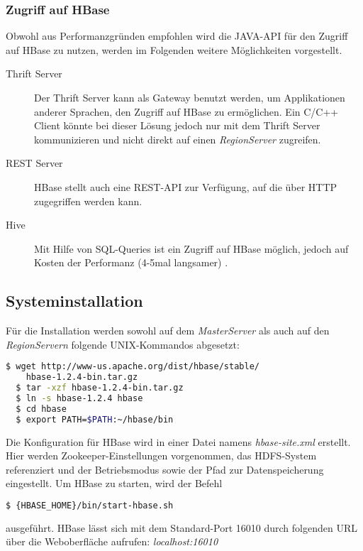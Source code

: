 \subsubsection{Zugriff auf HBase}
Obwohl aus Performanzgründen empfohlen wird die JAVA-API für den Zugriff auf HBase zu nutzen, werden im Folgenden weitere Möglichkeiten vorgestellt.
\begin{description}
\item[Thrift Server]
Der Thrift Server kann als Gateway benutzt werden, um Applikationen  anderer Sprachen, den Zugriff auf HBase zu ermöglichen. Ein C/C++ Client könnte bei dieser Lösung jedoch nur mit dem Thrift Server kommunizieren und nicht direkt auf einen \textit{RegionServer} zugreifen.

\item[REST Server]
HBase stellt auch eine REST-API zur Verfügung, auf die über HTTP zugegriffen werden kann.

\item[Hive] Mit Hilfe von SQL-Queries ist ein Zugriff auf HBase möglich, jedoch auf Kosten der Performanz (4-5mal langsamer) \cite{clo11}.
\end{description}


\subsection{Systeminstallation} %
Für die Installation werden sowohl auf dem  \textit{MasterServer} als auch auf den \textit{RegionServern} folgende UNIX-Kommandos abgesetzt:
\noindent 
\begin{lstlisting}[language=bash]
  $ wget http://www-us.apache.org/dist/hbase/stable/
    hbase-1.2.4-bin.tar.gz
  $ tar -xzf hbase-1.2.4-bin.tar.gz
  $ ln -s hbase-1.2.4 hbase
  $ cd hbase
  $ export PATH=$PATH:~/hbase/bin
\end{lstlisting}

Die Konfiguration für HBase wird in einer Datei namens \textit{hbase-site.xml} erstellt. Hier werden Zookeeper-Einstellungen vorgenommen, das HDFS-System referenziert und der Betriebsmodus sowie der Pfad zur Datenspeicherung eingestellt.
Um HBase zu starten, wird der Befehl 
\noindent 
\begin{lstlisting}[language=bash]
  $ {HBASE_HOME}/bin/start-hbase.sh 
\end{lstlisting}
ausgeführt. HBase lässt sich mit dem Standard-Port 16010 durch folgenden \ac{URL} über die Weboberfläche aufrufen: \textit{localhost:16010}


